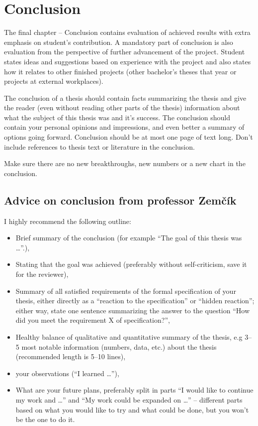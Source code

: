 \section{Conclusion}
\label{zaverPrace}

The final chapter -- Conclusion contains evaluation of achieved results with extra emphasis on student's contribution. A mandatory part of conclusion is also evaluation from the perspective of further advancement of the project. Student states ideas and suggestions based on experience with the project and also states how it relates to other finished projects (other bachelor's theses that year or projects at external workplaces).

The conclusion of a thesis should contain facts summarizing the thesis and give the reader (even without reading other parts of the thesis) information about what the subject of this thesis was and it's success. The conclusion should contain your personal opinions and impressions, and even better a summary of options going forward. Conclusion should be at most one page of text long. Don't include references to thesis text or literature in the conclusion.

Make sure there are no new breakthroughs, new numbers or a new chart in the conclusion.

\subsection{Advice on conclusion from professor Zemčík}

I highly recommend the following outline:
\begin{itemize}
  \item{Brief summary of the conclusion (for example ``The goal of this thesis was \ldots''.),}
  \item{Stating that the goal was achieved (preferably without self-criticism, save it for the reviewer),}
  \item{Summary of all satisfied requirements of the formal specification of your thesis, either directly as a ``reaction to the specification'' or ``hidden reaction''; either way, state one sentence summarizing the answer to the question ``How did you meet the requirement X of specification?'',}
  \item{Healthy balance of qualitative and quantitative summary of the thesis, e.g 3--5 most notable information (numbers, data, etc.) about the thesis (recommended length is 5--10 lines),}
  \item{your observations (``I learned \ldots''),}
  \item{What are your future plans, preferably split in parts ``I would like to continue my work and \ldots'' and ``My work could be expanded on \ldots'' -- different parts based on what you would like to try and what could be done, but you won't be the one to do it.}
\end{itemize}

